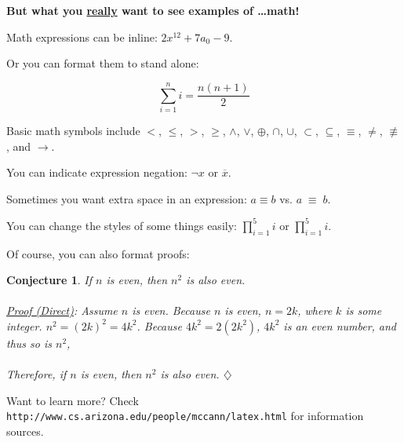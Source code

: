 \documentclass{article}         %
\newtheorem{conjecture}{Conjecture}  %
\begin{document}
\vspace*{1.0cm}

\textbf{\large But what you \underline{really} want to see
examples of \ldots math!}

Math expressions can be inline:  $2x^{12} + 7a_0 - 9$.

Or you can format them to stand alone:

\begin{displaymath}
\sum_{i=1}^{n} i = \frac{n(n+1)}{2}
\end{displaymath}

Basic math symbols include $<$, $\le$, $>$, $\ge$, $\land$, $\lor$,
$\oplus$, $\cap$, $\cup$, $\subset$, $\subseteq$, $\equiv$, $\neq$,
$\not\equiv$, and $\to$.

You can indicate expression negation:  $\neg x$ or $\overline{x}$.

Sometimes you want extra space in an expression:
$a \equiv b$ vs. $a \; \equiv \; b$.

You can change the styles of some things easily:  $\prod_{i=1}^{5} i$  or
$\prod\limits_{i=1}^{5} i$.

Of course, you can also format proofs:


  \begin{conjecture}  %
  If $n$ is even, then $n^2$ is also even.
  \\ \\
  \textup{\underline{Proof (Direct)}:} Assume $n$ is even.
  Because $n$ is even,  $n = 2k$, where $k$ is some
  integer.  $n^2 = (2k)^2 = 4k^2$.  Because $4k^2 = 2(2k^2)$, $4k^2$ is an
  even number, and thus so is $n^2$,
  \\ \\
  Therefore, if $n$ is even, then $n^2$ is also even.
  \hfill $\diamondsuit$
  \end{conjecture}

\vfill

Want to learn more?  Check
\verb+http://www.cs.arizona.edu/people/mccann/latex.html+
for information sources.
\end{document}
